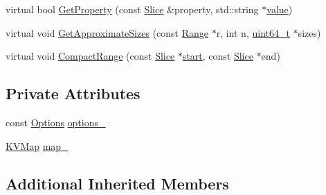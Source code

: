 \begin{DoxyCompactItemize}
\item 
virtual bool \hyperlink{classleveldb_1_1_model_d_b_a5c83a50a08e45c2564c39a650ea55b86}{Get\-Property} (const \hyperlink{classleveldb_1_1_slice}{Slice} \&property, std\-::string $\ast$\hyperlink{cache_8cc_a0f61d63b009d0880a89c843bd50d8d76}{value})
\item 
virtual void \hyperlink{classleveldb_1_1_model_d_b_aeb5502077fae602c5ca3c1153f29b693}{Get\-Approximate\-Sizes} (const \hyperlink{structleveldb_1_1_range}{Range} $\ast$r, int n, \hyperlink{stdint_8h_aaa5d1cd013383c889537491c3cfd9aad}{uint64\-\_\-t} $\ast$sizes)
\item 
virtual void \hyperlink{classleveldb_1_1_model_d_b_a7a04a6e5227079f861c26b920df6b833}{Compact\-Range} (const \hyperlink{classleveldb_1_1_slice}{Slice} $\ast$\hyperlink{db__bench_8cc_ab376b87f96a574a793c03c53e75afec8}{start}, const \hyperlink{classleveldb_1_1_slice}{Slice} $\ast$end)
\end{DoxyCompactItemize}
\subsection*{Private Attributes}
\begin{DoxyCompactItemize}
\item 
const \hyperlink{structleveldb_1_1_options}{Options} \hyperlink{classleveldb_1_1_model_d_b_ae5aee6801bcd1c2d8843607abb2e723a}{options\-\_\-}
\item 
\hyperlink{namespaceleveldb_aac1e50450147be263e08252c6700f7a7}{K\-V\-Map} \hyperlink{classleveldb_1_1_model_d_b_ada58b7989a2d120b45f5fed2e4391c65}{map\-\_\-}
\end{DoxyCompactItemize}
\subsection*{Additional Inherited Members}


